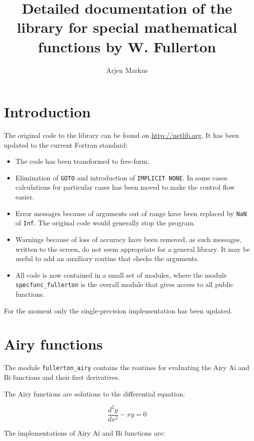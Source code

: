 \documentclass{article}
\begin{document}
\title{Detailed documentation of the library for special mathematical functions by W. Fullerton}
\author{Arjen Markus}
\maketitle

\section{Introduction}

The original code to the library can be found on \url{http://netlib.org}. It has been updated to the current
Fortran standard:

\begin{itemize}
\item
The code has been transformed to free-form.
\item
Elimination of \verb+GOTO+ and introduction of \verb+IMPLICIT NONE+. In some cases calculations for
particular cases has been moved to make the control flow easier.
\item
Error messages because of arguments out of range have been replaced by \verb+NaN+ of \verb+Inf+. The original code would
generally stop the program.
\item
Warnings because of loss of accuracy have been removed, as such messages, written to the screen, do not seem
appropriate for a general library. It may be useful to add an auxiliary routine that checks the arguments.
\item
All code is now contained in a small set of modules, where the module \verb+specfunc_fullerton+ is the overall
module that gives access to all public functions.
\end{itemize}

For the moment only the single-precision implementation has been updated.

\section{Airy functions}
The module \verb+fullerton_airy+ contains the routines for evaluating the Airy Ai and Bi functions and their
first derivatives.

The Airy functions are solutions to the differential equation:

\begin{equation}
    \frac{d^2y}{dx^2} - xy = 0
\end{equation}

The implementations of Airy Ai and Bi functions are:
\end{document}

